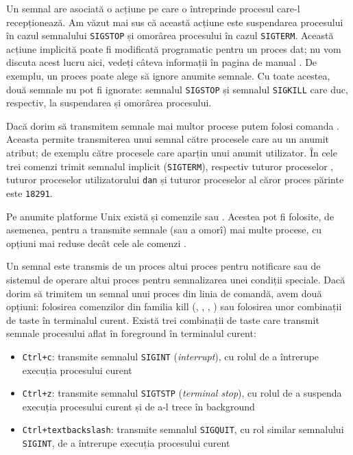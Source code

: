 Un semnal are asociată o acțiune pe care o întreprinde procesul care-l recepționează.
Am văzut mai sus că această acțiune este suspendarea procesului în cazul semnalului \texttt{SIGSTOP} și omorârea procesului în cazul \texttt{SIGTERM}.
Această acțiune implicită poate fi modificată programatic pentru un proces dat;
nu vom discuta acest lucru aici, vedeți câteva informații în pagina de manual .
De exemplu, un proces poate alege să ignore anumite semnale.
Cu toate acestea, două semnale nu pot fi ignorate: semnalul \texttt{SIGSTOP} și semnalul \texttt{SIGKILL} care duc, respectiv, la suspendarea și omorârea procesului.

Dacă dorim să transmitem semnale mai multor procese putem folosi comanda .
Aceasta permite transmiterea unui semnal către procesele care au un anumit atribut;
de exemplu către procesele care aparțin unui anumit utilizator.
În  cele trei comenzi trimit semnalul implicit (\texttt{SIGTERM}), respectiv tuturor proceselor , tuturor proceselor utilizatorului \texttt{dan} și tuturor proceselor al căror proces părinte este \texttt{18291}.


Pe anumite platforme Unix există și comenzile  sau .
Acestea pot fi folosite, de asemenea, pentru a transmite semnale (sau a omorî) mai multe procese, cu opțiuni mai reduse decât cele ale comenzi .

Un semnal este transmis de un proces altui proces pentru notificare sau de sistemul de operare altui proces pentru semnalizarea unei condiții speciale.
Dacă dorim să trimitem un semnal unui proces din linia de comandă, avem două opțiuni: folosirea comenzilor din familia kill (, , , ) sau folosirea unor combinații de taste în terminalul curent.
Există trei combinații de taste care transmit semnale procesului aflat în foreground în terminalul curent:

\begin{itemize}
  \item \texttt{Ctrl+c}: transmite semnalul \texttt{SIGINT} (\textit{interrupt}), cu rolul de a întrerupe execuția procesului curent
  \item \texttt{Ctrl+z}: transmite semnalul \texttt{SIGTSTP} (\textit{terminal stop}), cu rolul de a suspenda execuția procesului curent și de a-l trece în background
  \item \texttt{Ctrl+textbackslash{}}: transmite semnalul \texttt{SIGQUIT}, cu rol similar semnalului \texttt{SIGINT}, de a întrerupe execuția procesului curent
\end{itemize}

